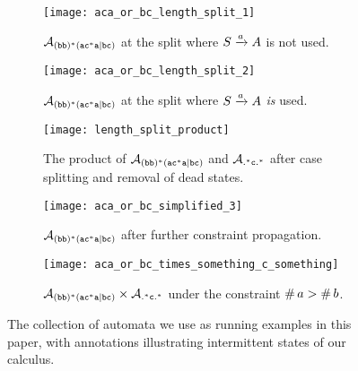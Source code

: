 \documentclass[acmsmall,review,anonymous,screen]{acmart}\settopmatter{printfolios=true,printccs=true,printacmref=true}
\theoremstyle{definition}
\begin{document}
\begin{figure}[p]
\begin{subfigure}[b]{0.49\textwidth}
    \centering
      \texttt{[image: aca\_or\_bc\_length\_split\_1]}
      \caption{$\mathcal{A}_{\mathtt{(bb)^\ast(ac^\ast{}a|bc)}}{}$ at the split where $S \xrightarrow{a} A$ is not
      used.}\label{fig:aca-or-bc-length-split-1}
  \end{subfigure}
  \hfill
  \begin{subfigure}[b]{0.49\textwidth}
    \centering
      \texttt{[image: aca\_or\_bc\_length\_split\_2]}
      \caption{$\mathcal{A}_{\mathtt{(bb)^\ast(ac^\ast{}a|bc)}}{}$ at the split where $S \xrightarrow{a} A$ \emph{is} used.}\label{fig:aca-or-bc-length-split-2}
  \end{subfigure}
  \hfill
  \begin{subfigure}[b]{0.49\textwidth}
    \centering
      \texttt{[image: length\_split\_product]}
      \caption{The product of $\mathcal{A}_{\mathtt{(bb)^\ast(ac^\ast{}a|bc)}}$ and $\mathcal{A}_{\mathtt{.^\ast{}c.^\ast}}$ after
      case splitting and removal of dead states.}\label{fig:length-split-product}
  \end{subfigure}
  \hfill
  \begin{subfigure}[b]{0.49\textwidth}
    \centering
      \texttt{[image: aca\_or\_bc\_simplified\_3]}
      \caption{$\mathcal{A}_{\mathtt{(bb)^\ast(ac^\ast{}a|bc)}}{}$ after further constraint propagation.}\label{fig:example-simplify-3}
  \end{subfigure}
  \hfill
  \begin{subfigure}[b]{0.6\textwidth}
    \centering
        \texttt{[image: aca\_or\_bc\_times\_something\_c\_something]}
        \caption{$\mathcal{A}_{\mathtt{(bb)^\ast(ac^\ast{}a|bc)}}{} \times \mathcal{A}_{\mathtt{.^\ast{}c.^\ast}}{}$ under the constraint
        $\operatorname{\#}{a} > \operatorname{\#}{b}$.}\label{fig:final-example} 
  \end{subfigure}
  \caption{The collection of automata we use as running examples in this paper, with annotations illustrating intermittent states of our calculus.}    
  \end{figure}
\end{document}
